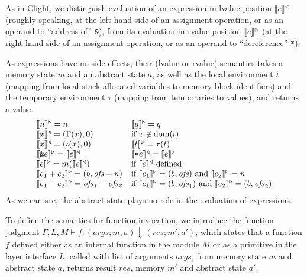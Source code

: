 As in Clight, we distinguish evaluation of an expression in lvalue
position $\llbracket{} e \rrbracket{}^\triangleleft$ (roughly
speaking, at the left-hand-side of an assignment operation, or as an
operand to ``address-of'' \texttt{\&}), from its evaluation in rvalue
position $\llbracket{} e \rrbracket{}^\triangleright$ (at the
right-hand-side of an assignment operation, or as an operand to
``dereference'' \texttt{*}).

As expressions have no side effects, their (lvalue or rvalue)
semantics takes a memory state $m$ and an abstract state $a$, as well
as the local environment $\iota$ (mapping from local stack-allocated
variables to memory block identifiers) and the temporary environment
$\tau$ (mapping from temporaries to values), and returns a value.
\[
\begin{array}{ll}
  \llbracket{} n \rrbracket{}^\triangleright  = n &
  \llbracket{} q \rrbracket{}^\triangleright  = q \\
  \llbracket{} x \rrbracket{}^\triangleleft = (\Gamma(x), 0) & \text{if} ~ x \not\in \mathrm{dom}(\iota) \\
  \llbracket{} x \rrbracket{}^\triangleleft = (\iota(x), 0)  
  &
  \llbracket{} t \rrbracket{}^\triangleright  = \tau(t) \\
  \llbracket{} \texttt{\&}e \rrbracket{}^\triangleright  = \llbracket{} e \rrbracket{}^\triangleleft &
  \llbracket{} \texttt{*}e \rrbracket{}^\triangleleft  = \llbracket{} e \rrbracket{}^\triangleright \\
  \llbracket{} e \rrbracket{}^\triangleright  = m(\llbracket{} e \rrbracket{}^\triangleleft) & \text{if} ~ \llbracket{} e \rrbracket{}^\triangleleft ~ \text{defined} \\
  \llbracket{} e_1 + e_2 \rrbracket{}^\triangleright  = (b, \mathit{ofs} + n) & \text{if} ~ \llbracket{} e_1 \rrbracket{}^\triangleright = (b, \mathit{ofs})  \text{ and} ~ \llbracket{} e_2 \rrbracket{}^\triangleright = n \\
  \llbracket{} e_1 - e_2 \rrbracket{}^\triangleright  = \mathit{ofs_1} - \mathit{ofs_2} & \text{if} ~ \llbracket{} e_1 \rrbracket{}^\triangleright = (b, \mathit{ofs}_1)  \text{ and} ~ \llbracket{} e_2 \rrbracket{}^\triangleright = (b, \mathit{ofs}_2)
\end{array}
\]
As we can see, the abstract state plays no role in the evaluation of
expressions.

To define the semantics for function invocation, 
we introduce the function judgment $\Gamma, L, M \vdash f : (\mathit{args};
m, a) \Downarrow (\mathit{res}; m', a')$, which states that a function $f$
defined either as an internal function in the module $M$ or as a
primitive in the layer interface $L$, called with list of arguments
$\mathit{args}$, from memory state $m$ and abstract state $a$, returns
result $\mathit{res}$, memory $m'$ and abstract state $a'$.

